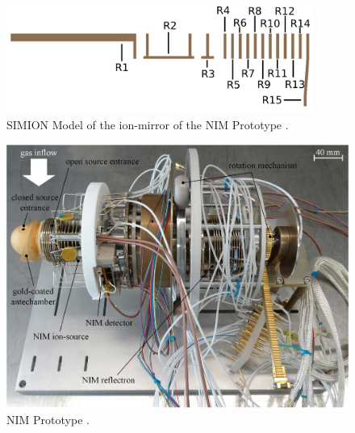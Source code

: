 		\begin{figure}[h]
			\centering
			\includegraphics[width=0.9\textwidth]{Setup/Prototype_Reflectron_sim.png}
			\caption{SIMION Model of the ion-mirror of the NIM Prototype \cite{Diss_Meyer}.}
			\label{fig:SetupProtoReflSim}
		\end{figure}
		
		\begin{figure}[h] %
			\centering
			\includegraphics[width=\textwidth]{Setup/Prototype_totPic.jpg}
			\caption{NIM Prototype \cite{Diss_Meyer}.}
			\label{fig:SetupProto}
		\end{figure}

		
